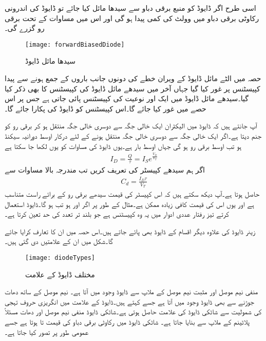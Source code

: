 اسی طرح اگر ڈایوڈ کو منبع برقی دباو  سے سیدھا مائل کیا جائے تو ڈایوڈ کی اندرونی رکاوٹی برقی دباو میں  وولٹ کی کمی پیدا ہو گی اور اس میں مساوات   کے تحت برقی رو گزرے گی۔
\begin{figure}
\centering
\texttt{[image: forwardBiasedDiode]}
\caption{سیدھا مائل  ڈایوڈ}
\label{شکل_سیدھا_مائل_ڈایوڈ}
\end{figure}
حصہ  میں الٹے مائل ڈایوڈ کے ویران خطے کی دونوں جانب باروں کے جمع ہونے سے پیدا کپیسٹنس پر غور کیا گیا جہاں آخر میں سیدھے مائل ڈایوڈ کی کپیسٹنس کا بھی ذکر کیا گیا۔سیدھے مائل ڈایوڈ میں ایک اور نوعیت کی کپیسٹنس پائی جاتی ہے جس پر اس حصے میں غور کیا جائے گا۔اس کپیسٹنس کو ڈایوڈ کی  پکارا جائے گا۔

آپ جانتے ہیں کہ ڈایوڈ میں الیکٹران ایک خالی جگہ سے دوسری خالی جگہ منتقل ہو کر برقی رو کو جنم دیتا ہے۔اگر ایک خالی جگہ سے دوسری خالی جگہ منتقل ہونے کے لئے درکار اوسط دورانیہ  سیکنڈ ہو تب اوسط برقی رو  ہو گی جہاں  اوسط بار ہے۔یوں ڈایوڈ کی مساوات کو یوں لکھا جا سکتا ہے
\begin{align}
I_D=\frac{Q}{\tau}= I_S e^{\frac{V_D}{V_T}}
\end{align}
اگر ہم سیدھے کپیسٹر کی تعریف  کریں تب مندرجہ بالا مساوات سے
\begin{align}\label{مساوات_ڈایوڈ_نفوذی_کپیسٹر}
C_d=\frac{I_D \tau}{V_T}
\end{align} 
حاصل ہوتا ہے۔آپ دیکھ سکتے ہیں کہ اس کپیسٹر کی قیمت سیدھے برقی رو کے برائے راست متناسب ہے اور یوں اس کی قیمت کافی زیادہ ممکن ہے۔مثال کے طور پر اگر  اور  ہو تب  ہو گا۔ڈایوڈ استعمال کرتے تیز رفتار عددی ادوار میں یہ وہ کپیسٹنس ہے جو بلند تر تعدد کی حد تعین کرتا ہے۔

زینر  ڈایوڈ کی علاوہ دیگر اقسام کے  ڈایوڈ بھی پائے جاتے ہیں۔اس حصہ میں ان کا تعارف کرایا جائے گا۔شکل   میں ان کے علامتیں دی گئی ہیں۔
\begin{figure}
\centering
\texttt{[image: diodeTypes]}
\caption{مختلف ڈایوڈ کے علامت}
\label{شکل_مختلف_ڈایوڈ_کے_علامات}
\end{figure}
منفی نیم موصل اور مثبت نیم موصل کے ملاپ سے ڈایوڈ وجود میں آتا ہے۔ نیم موصل کے ساتھ دھات جوڑنے سے بھی  ڈایوڈ وجود میں آتا ہے جسے   کہتے ہیں۔ڈایوڈ کے علامت میں انگریزی حروف تہجی   کی شمولیت سے شاٹکی ڈایوڈ کی علامت حاصل ہوتی ہے۔شاٹکی  ڈایوڈ منفی نیم موصل  اور دھات مسئلاً پلاٹینم کے ملاپ سے بنایا جاتا ہے۔ شاٹکی ڈایوڈ میں رکاوٹی برقی دباو کی قیمت    تا   ہوتا ہے جسے عمومی طور پر   تصور کیا جاتا ہے۔

